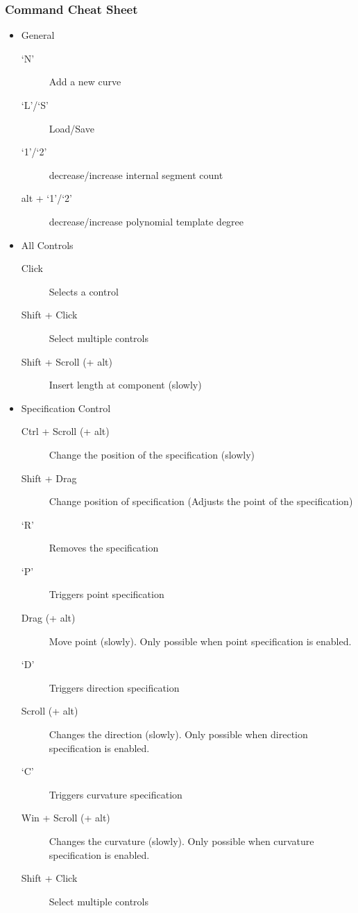 \documentclass[a4paper]{article}
\begin{document}
				\subsubsection{Command Cheat Sheet}
					\begin{itemize}
						\item General
						\begin{description}
							\item[`N'] Add a new curve
							\item[`L'/`S'] Load/Save
							\item[`1'/`2'] decrease/increase internal segment count
							\item[alt + `1'/`2'] decrease/increase polynomial template degree
						\end{description}
						\item All Controls
						\begin{description}
							\item[Click] Selects a control 
							\item[Shift + Click] Select multiple controls
							\item[Shift + Scroll (+ alt)] Insert length at component (slowly)
						\end{description}
						\item Specification Control
						\begin{description}
							\item[Ctrl + Scroll (+ alt)] Change the position of the specification (slowly)
							\item[Shift + Drag] Change position of specification (Adjusts the point of the specification)
							\item[`R'] Removes the specification
							\item[`P'] Triggers point specification
							\item[Drag (+ alt)] Move point (slowly). Only possible when point specification is enabled.
							\item[`D'] Triggers direction specification
							\item[Scroll (+ alt)] Changes the direction (slowly). Only possible when direction specification is enabled.
							\item[`C'] Triggers curvature specification
							\item[Win + Scroll (+ alt)] Changes the curvature (slowly). Only possible when curvature specification is enabled.
							\item[Shift + Click] Select multiple controls

\end{description}
\end{itemize}
\end{document}
